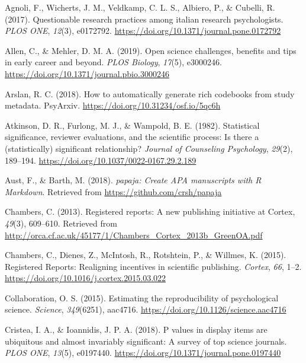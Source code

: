 \documentclass[british,,man,floatsintext]{apa6}
\begin{document}
\leavevmode\hypertarget{ref-Agnoli2017}{}%
Agnoli, F., Wicherts, J. M., Veldkamp, C. L. S., Albiero, P., \& Cubelli, R. (2017). Questionable research practices among italian research psychologists. \emph{PLOS ONE}, \emph{12}(3), e0172792. \url{https://doi.org/10.1371/journal.pone.0172792}

\leavevmode\hypertarget{ref-Allen2019}{}%
Allen, C., \& Mehler, D. M. A. (2019). Open science challenges, benefits and tips in early career and beyond. \emph{PLOS Biology}, \emph{17}(5), e3000246. \url{https://doi.org/10.1371/journal.pbio.3000246}

\leavevmode\hypertarget{ref-R-codebook}{}%
Arslan, R. C. (2018). How to automatically generate rich codebooks from study metadata. PsyArxiv. \url{https://doi.org/10.31234/osf.io/5qc6h}

\leavevmode\hypertarget{ref-Atkinson1982}{}%
Atkinson, D. R., Furlong, M. J., \& Wampold, B. E. (1982). Statistical significance, reviewer evaluations, and the scientific process: Is there a (statistically) significant relationship? \emph{Journal of Counseling Psychology}, \emph{29}(2), 189--194. \url{https://doi.org/10.1037/0022-0167.29.2.189}

\leavevmode\hypertarget{ref-R-papaja}{}%
Aust, F., \& Barth, M. (2018). \emph{papaja: Create APA manuscripts with R Markdown}. Retrieved from \url{https://github.com/crsh/papaja}

\leavevmode\hypertarget{ref-Chambers2013}{}%
Chambers, C. (2013). Registered reports: A new publishing initiative at Cortex, \emph{49}(3), 609--610. Retrieved from \url{http://orca.cf.ac.uk/45177/1/Chambers_Cortex_2013b_GreenOA.pdf}

\leavevmode\hypertarget{ref-Chambers2015}{}%
Chambers, C., Dienes, Z., McIntosh, R., Rotshtein, P., \& Willmes, K. (2015). Registered Reports: Realigning incentives in scientific publishing. \emph{Cortex}, \emph{66}, 1--2. \url{https://doi.org/10.1016/j.cortex.2015.03.022}

\leavevmode\hypertarget{ref-OSC2015}{}%
Collaboration, O. S. (2015). Estimating the reproducibility of psychological science. \emph{Science}, \emph{349}(6251), aac4716. \url{https://doi.org/10.1126/science.aac4716}

\leavevmode\hypertarget{ref-Cristea2018}{}%
Cristea, I. A., \& Ioannidis, J. P. A. (2018). P values in display items are ubiquitous and almost invariably significant: A survey of top science journals. \emph{PLOS ONE}, \emph{13}(5), e0197440. \url{https://doi.org/10.1371/journal.pone.0197440}
\end{document}
